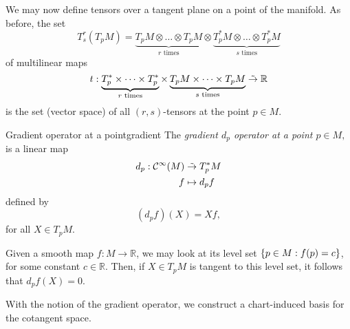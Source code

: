 We may now define tensors over a tangent plane on a point of the manifold. As before, the set
\begin{equation*}
    T_s^r(T_pM) = \underbrace{T_pM \otimes \dots \otimes T_pM}_{r\text{ times}} \otimes \underbrace{T_p ^{\ast}M \otimes \dots \otimes T_p ^{\ast} M}_{s \text{ times}}
\end{equation*}
of multilinear maps
\begin{equation*}
    t : \underbrace{T_p^{\ast} \times \dots \times T_p^{\ast}}_{r\text{ times}} \times \underbrace{T_pM \times \dots \times T_pM}_{s \text{ times}} \mathrel{\tilde{\to}} \mathbb{R}
\end{equation*}
is the set (vector space) of all \((r,s)\)-tensors at the point \(p \in M\).

\begin{definition}{Gradient operator at a point}{gradient}
    The \emph{gradient \(d_p\) operator at a point \(p \in M,\)} is a linear map
    \begin{align*}
        d_p : \mathcal{C}^\infty(M) &\mathrel{\tilde{\to}} T_p ^{\ast}M\\
                                  f &\mapsto d_p f
    \end{align*}
    defined by
    \begin{equation*}
        (d_p f)(X) = Xf,
    \end{equation*}
    for all \(X \in T_pM\).
\end{definition}

Given a smooth map \(f : M \to \mathbb{R}\), we may look at its level set \(\{p \in M : f(p) = c\}\), for some constant \(c \in \mathbb{R}\). Then, if \(X \in T_pM\) is tangent to this level set, it follows that \(d_p f(X) = 0\).

With the notion of the gradient operator, we construct a chart-induced basis for the cotangent space.

